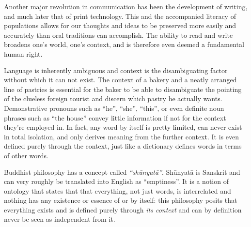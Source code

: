 Another major revolution in communication has been the development of writing,
and much later that of print technology. This and the accompanied literacy of
populations allows for our thoughts and ideas to be preserved more easily and
accurately than oral traditions can accomplish. The ability to read and write
broadens one's world, one's context, and is therefore even deemed a fundamental
human right. 

Language is inherently ambiguous and context is the disambiguating factor
without which it can not exist. The context of a bakery and a neatly arranged
line of pastries is essential for the baker to be able to disambiguate the
pointing of the clueless foreign tourist and discern which pastry he actually
wants. Demonstrative pronouns such as ``he'', ``she'', ``this'', or even
definite noun phrases such as ``the house'' convey little information if not
for the context they're employed in.  In fact, any word by itself is pretty
limited, can never exist in total isolation, and only derives meaning from the
further context. It is even defined purely through the context, just like a
dictionary defines words in terms of other words.


Buddhist philosophy has a concept called \emph{``sh\=unyat\=a''}. Sh\=unyat\=a is Sanskrit and can
very roughly be translated into English as ``emptiness''. It is a notion of
ontology that states that that everything, not just words, is interrelated and nothing has any
existence or essence of or by itself: this philosophy posits that everything
exists and is defined purely through \emph{its context} and can by definition
never be seen as independent from it.

